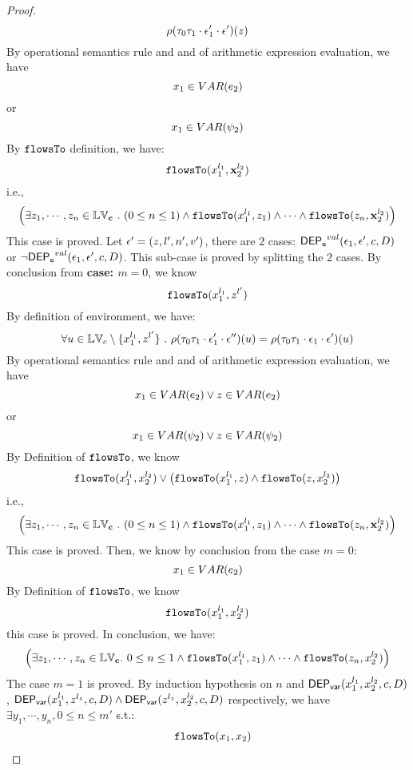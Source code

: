 \begin{proof}
\[  \rho(\mathtt{\tau}_0 \mathtt{\tau}_1 \cdot \mathtt{\epsilon}_1' \cdot \mathtt{\epsilon}') (z)
\]
By operational semantics rule  and  and  of arithmetic expression evaluation, we have 
\[
  x_1 \in VAR(e_2) 
\]
or
\[
  x_1 \in VAR(\psi_2)
\]
%
By $\mathtt{flowsTo}$ definition, we have:
%
\[
\mathtt{flowsTo}(x_1^{l_1}, {\boldsymbol{\mathbf{x}}}_2^{l_2})
\]
i.e.,
%
\[
 \Big( \exists z_1, \cdots, z_n \in \mathbb{LV}_{{\boldsymbol{\mathbf{c}}}} ~.~ (0 \leq n \leq 1 )
 \land \mathtt{flowsTo}(x_1^{l_1}, z_1) \land \cdots \land \mathtt{flowsTo}(z_n, {\boldsymbol{\mathbf{x}}}_2^{l_2}) \Big)
\]
%
This case is proved.
%
%
Let $\mathtt{\epsilon}' = (z, l', n', v')$, there are 2 cases:
%
$\mathsf{DEP_{\mathtt{e}}}^{val}(\mathtt{\epsilon}_1, \mathtt{\epsilon}', c, D)$ or $\neg \mathsf{DEP_{\mathtt{e}}}^{val}(\mathtt{\epsilon}_1, \mathtt{\epsilon}', c, D)$.
%
This sub-case is proved by splitting the 2 cases.
%
%
By conclusion from \textbf{case: $m = 0$}, we know
\[
  \mathtt{flowsTo}(x_1^{l_1}, z^{l'})
\]
%
By definition of environment, we have:
\[
  \forall u \in \mathbb{LV}_c \setminus \{x_1^{l_1}, z^{l'}\} ~.~
  \rho(\mathtt{\tau}_0 \mathtt{\tau}_1 \cdot \mathtt{\epsilon}_1' \cdot \mathtt{\epsilon}'') (u) =  
  \rho(\mathtt{\tau}_0 \mathtt{\tau}_1 \cdot \mathtt{\epsilon}_1 \cdot \mathtt{\epsilon}') (u)
\]
By operational semantics rule  and  and  of arithmetic expression evaluation, we have 
\[
  x_1 \in VAR(e_2) \lor z \in VAR(e_2)
\]
or
\[
  x_1 \in VAR(\psi_2) \lor z \in VAR(\psi_2)
\]
%
By Definition of $\mathtt{flowsTo}$, we know
\[
  \mathtt{flowsTo}(x_1^{l_1}, x_2^{l_2}) \lor 
  \big(\mathtt{flowsTo}(x_1^{l_1}, z) \land \mathtt{flowsTo}(z, x_2^{l_2}) \big)
\]
%
i.e.,
%
\[
 \Big( \exists z_1, \cdots, z_n \in \mathbb{LV}_{{\boldsymbol{\mathbf{c}}}} ~.~ (0 \leq n \leq 1 )
 \land \mathtt{flowsTo}(x_1^{l_1}, z_1) \land \cdots \land \mathtt{flowsTo}(z_n, {\boldsymbol{\mathbf{x}}}_2^{l_2}) \Big)
\]
%
This case is proved.
%
Then, we know by conclusion from the case $m = 0$:
\[
  x_1 \in VAR(e_2)
\]
%
By Definition of $\mathtt{flowsTo}$, we know
\[
  \mathtt{flowsTo}(x_1^{l_1}, x_2^{l_2}) 
\]
this case is proved.
%
In conclusion, we have:
\[
  \Big( \exists z_1, \cdots, z_n \in \mathbb{LV}_{{\boldsymbol{\mathbf{c}}}}. ~ 0 \leq n \leq 1 \land
  \mathtt{flowsTo}(x_1^{l_1}, z_1) 
  \land \cdots \land \mathtt{flowsTo}(z_n, x_2^{l_2}) \Big)
\]
The case $m = 1$ is proved.
%
By induction hypothesis on $n$ and $\mathsf{DEP_{var}}(x_1^{l_1}, x_2^{l_2}, c, D)$, 
$\mathsf{DEP_{var}}(x_1^{l_1}, z^{l_z}, c, D) \land \mathsf{DEP_{var}}(z^{l_z}, x_2^{l_2}, c, D)$ respectively, 
we have $\exists y_1, \cdots, y_n, 0 \leq n \leq m'$ s.t.:
\[
\begin{array}{ll}
      & \mathtt{flowsTo}(x_1, x_2) \\

\end{array}\]
\end{proof}
